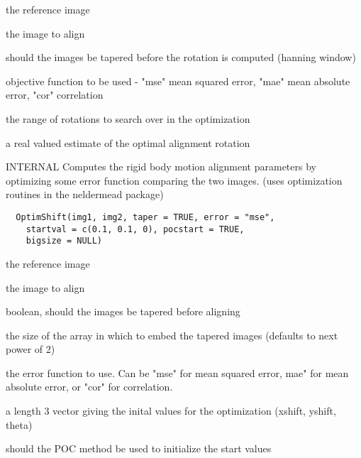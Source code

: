 \documentclass[a4paper]{book}
\begin{document}
%
\begin{Arguments}
\begin{ldescription}
\item[\code{img1}] the reference image

\item[\code{img2}] the image to align

\item[\code{taper}] should the images be tapered before the
rotation is computed (hanning window)

\item[\code{error}] objective function to be used - "mse" mean
squared error, "mae" mean absolute error, "cor"
correlation

\item[\code{searchrange}] the range of rotations to search over
in the optimization
\end{ldescription}
\end{Arguments}
%
\begin{Value}
a real valued estimate of the optimal alignment rotation
\end{Value}
%
\begin{Description}\relax
INTERNAL Computes the rigid body motion alignment
parameters by optimizing some error function comparing
the two images. (uses optimization routines in the
neldermead package)
\end{Description}
%
\begin{Usage}
\begin{verbatim}
  OptimShift(img1, img2, taper = TRUE, error = "mse",
    startval = c(0.1, 0.1, 0), pocstart = TRUE,
    bigsize = NULL)
\end{verbatim}
\end{Usage}
%
\begin{Arguments}
\begin{ldescription}
\item[\code{img1}] the reference image

\item[\code{img2}] the image to align

\item[\code{taper}] boolean, should the images be tapered before
aligning

\item[\code{bigsize}] the size of the array in which to embed
the tapered images (defaults to next power of 2)

\item[\code{error}] the error function to use. Can be "mse" for
mean squared error, mae" for mean absolute error, or
"cor" for correlation.

\item[\code{startval}] a length 3 vector giving the inital
values for the optimization (xshift, yshift, theta)

\item[\code{pocstart}] should the POC method be used to
initialize the start values
\end{ldescription}
\end{Arguments}
\end{document}
